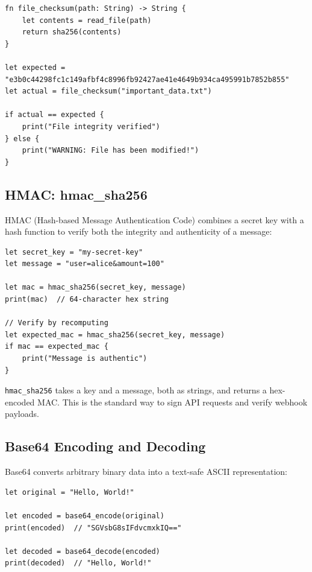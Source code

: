 \begin{lstlisting}[language=Lattice, caption={File integrity checking with sha256}]
fn file_checksum(path: String) -> String {
    let contents = read_file(path)
    return sha256(contents)
}

let expected = "e3b0c44298fc1c149afbf4c8996fb92427ae41e4649b934ca495991b7852b855"
let actual = file_checksum("important_data.txt")

if actual == expected {
    print("File integrity verified")
} else {
    print("WARNING: File has been modified!")
}
\end{lstlisting}

\subsection{HMAC: hmac\_sha256}\label{sec:hmac}


HMAC (Hash-based Message Authentication Code) combines a secret key with a
hash function to verify both the integrity and authenticity of a message:

\begin{lstlisting}[language=Lattice, caption={Computing an HMAC}]
let secret_key = "my-secret-key"
let message = "user=alice&amount=100"

let mac = hmac_sha256(secret_key, message)
print(mac)  // 64-character hex string

// Verify by recomputing
let expected_mac = hmac_sha256(secret_key, message)
if mac == expected_mac {
    print("Message is authentic")
}
\end{lstlisting}

\lstinline|hmac_sha256| takes a key and a message, both as strings, and
returns a hex-encoded MAC. This is the standard way to sign API requests and
verify webhook payloads.

\subsection{Base64 Encoding and Decoding}\label{sec:base64}


Base64 converts arbitrary binary data into a text-safe ASCII representation:

\begin{lstlisting}[language=Lattice, caption={Base64 encoding and decoding}]
let original = "Hello, World!"

let encoded = base64_encode(original)
print(encoded)  // "SGVsbG8sIFdvcmxkIQ=="

let decoded = base64_decode(encoded)
print(decoded)  // "Hello, World!"
\end{lstlisting}

